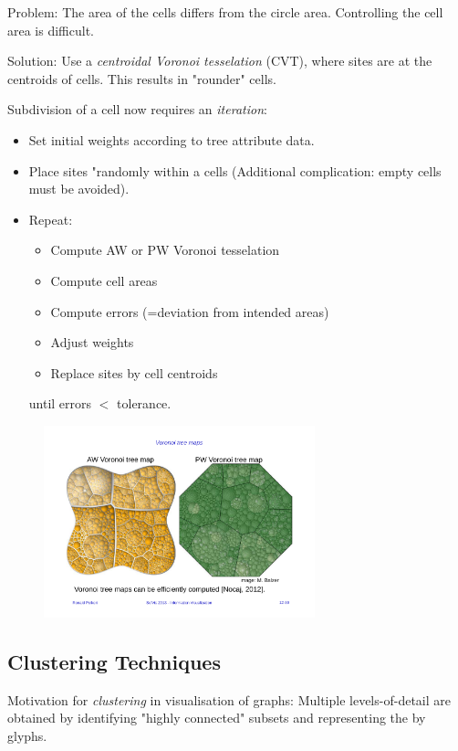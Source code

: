 Problem: The area of the cells differs from the circle area. Controlling the cell area is difficult.

Solution: Use a \emph{centroidal Voronoi tesselation} (CVT), where sites are at the centroids of cells. 
This results in "rounder" cells. 

Subdivision of a cell now requires an \emph{iteration}:
\begin{itemize}
\item Set initial weights according to tree attribute data.
\item Place sites "randomly within a cells (Additional complication: empty cells must be avoided).
\item Repeat:
    \begin{itemize}
        \item Compute AW or PW Voronoi tesselation
        \item Compute cell areas
        \item Compute errors (=deviation from intended areas)
        \item Adjust weights
        \item Replace sites by cell centroids
    \end{itemize}
    
    until errors $<$ tolerance.
\end{itemize}

\begin{figure}[H]
\centering
\includegraphics[width=0.7\textwidth]{img/12_voronoi_tree_map}
\end{figure}

\subsection{Clustering Techniques}
Motivation for \emph{clustering} in visualisation of graphs: Multiple levels-of-detail are obtained by identifying  "highly connected" subsets and representing the by glyphs.

